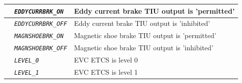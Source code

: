 \begin{itemize}
\begin{longtable}{|l|l|l|}
			\hline

			&	\begin{minipage}[t]{0.40\linewidth} \emph{\texttt{EDDYCURRBRK\_ON}} \end{minipage}
			&	\begin{minipage}[t]{0.38\linewidth} Eddy current brake TIU output is ’permitted’ \end{minipage} \\

			\hline

			&	\begin{minipage}[t]{0.40\linewidth} \emph{\texttt{EDDYCURRBRK\_OFF}} \end{minipage}
			&	\begin{minipage}[t]{0.38\linewidth} Eddy current brake TIU output is ’inhibited’ \end{minipage} \\

			\hline

			&	\begin{minipage}[t]{0.40\linewidth} \emph{\texttt{MAGNSHOEBRK\_ON}} \end{minipage}
			&	\begin{minipage}[t]{0.38\linewidth} Magnetic shoe brake TIU output is ’permitted’ \end{minipage} \\

			\hline

			&	\begin{minipage}[t]{0.40\linewidth} \emph{\texttt{MAGNSHOEBRK\_OFF}} \end{minipage}
			&	\begin{minipage}[t]{0.38\linewidth} Magnetic shoe brake TIU output is ’inhibited’ \end{minipage} \\

			\hline

			&	\begin{minipage}[t]{0.40\linewidth} \emph{\texttt{LEVEL\_0}} \end{minipage}
			&	\begin{minipage}[t]{0.38\linewidth} EVC ETCS is level 0 \end{minipage} \\

			\hline

			&	\begin{minipage}[t]{0.40\linewidth} \emph{\texttt{LEVEL\_1}} \end{minipage}
			&	\begin{minipage}[t]{0.38\linewidth} EVC ETCS is level 1 \end{minipage} \\


\end{longtable}
\end{itemize}
